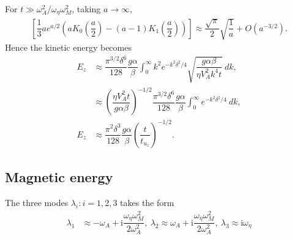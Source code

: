 \documentclass[12pt,psfig]{article}
\begin{document}
For $t\gg \omega_A^2/\omega_\eta\omega_M^2$, taking $a\rightarrow \infty$, 
\begin{align*}
\left[\dfrac{1}{3} a e^{a/2} \left(a K_0\left(\dfrac{a}{2}\right)-(a-1) K_1\left(\dfrac{a}{2}\right)\right)\right]\approx \dfrac{\sqrt{\pi }}{2} \sqrt{\dfrac{1}{a}}+O(a^{-3/2}).
\end{align*}
Hence the kinetic energy becomes
\begin{align*}
E_z&\approx \dfrac{\pi^{3/2}\delta^6}{128}\dfrac{g\alpha}{\beta}\int_{0}^{\infty}k^2 e^{-k^2\delta^2/4} \sqrt{\dfrac{g\alpha\beta}{\eta V_A^2k^4 t}} \ dk,\\
&\approx \left(\dfrac{\eta V_A^2t}{g\alpha\beta}\right)^{-1/2}\dfrac{\pi^{3/2}\delta^6}{128}\dfrac{g\alpha}{\beta}\int_{0}^{\infty} e^{-k^2\delta^2/4}  \ dk,\\
E_z&\approx \dfrac{\pi^{2}\delta^3}{128}\dfrac{g\alpha}{\beta}\left(\dfrac{t}{t_{u_z}}\right)^{-1/2}.
\end{align*}
\subsection{Magnetic energy}
The three modes $\lambda_i: i=1,2,3$ takes the form
\begin{align*}
\lambda_1&\approx -\omega_A+\mathrm{i}\dfrac{\omega_\eta \omega_M^2}{2 \omega_A^2}, \ 
\lambda_2\approx \omega_A+\mathrm{i}\dfrac{\omega_\eta \omega_M^2}{2 \omega_A^2},\ 
\lambda_3\approx \mathrm{i}\omega_\eta
\end{align*}
\end{document}
